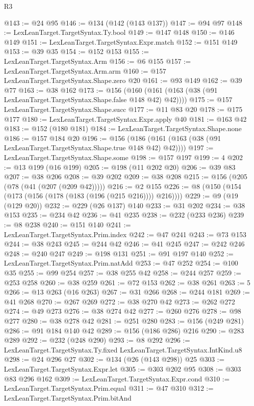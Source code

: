 \begin{lexlean}{R3}
\begin{coremodule}
@143 := @24 @95
@146 := @134 (@142 (@143 @137))
@147 := @94 @97
@148 := LexLeanTarget.TargetSyntax.Ty.bool
@149 := @147 @148
@150 := @146 @149
@151 := LexLeanTarget.TargetSyntax.Expr.match
@152 := @151 @149
@153 := @39 @35
@154 := @152 @153
@155 := LexLeanTarget.TargetSyntax.Arm
@156 := @6 @155
@157 := LexLeanTarget.TargetSyntax.Arm.arm
@160 := @157 LexLeanTarget.TargetSyntax.Shape.zero @20
@161 := @93 @149
@162 := @39 @77
@163 := @38 @162
@173 := @156 (@160 (@161 (@163 (@38 (@91 LexLeanTarget.TargetSyntax.Shape.false @148 @42) @42))))
@175 := @157 LexLeanTarget.TargetSyntax.Shape.succ
@177 := @11 @83 @20
@178 := @175 @177
@180 := LexLeanTarget.TargetSyntax.Expr.apply @40
@181 := @163 @42
@183 := @152 (@180 @181)
@184 := LexLeanTarget.TargetSyntax.Shape.none
@186 := @157 @184 @20
@196 := @156 (@186 (@161 (@163 (@38 (@91 LexLeanTarget.TargetSyntax.Shape.true @148 @42) @42))))
@197 := LexLeanTarget.TargetSyntax.Shape.some
@198 := @157 @197
@199 := 4
@202 := @13 @199 (@16 @199)
@205 := @198 (@11 @202 @20)
@206 := @39 @83
@207 := @38 @206
@208 := @39 @202
@209 := @38 @208
@215 := @156 (@205 (@78 (@41 (@207 (@209 @42)))))
@216 := @2 @155
@226 := @8 (@150 (@154 (@173 (@156 (@178 (@183 (@196 (@215 @216)))) @216))))
@229 := @9 (@19 (@129 @20))
@232 := @229 (@26 @137) @140
@233 := @31 @202
@234 := @38 @153
@235 := @234 @42
@236 := @41 @235
@238 := @232 (@233 @236)
@239 := @8 @238
@240 := @151 @140
@241 := LexLeanTarget.TargetSyntax.Prim.index
@242 := @47 @241
@243 := @73 @153
@244 := @38 @243
@245 := @244 @42
@246 := @41 @245
@247 := @242 @246
@248 := @240 @247
@249 := @198 @131
@251 := @91 @197 @140
@252 := LexLeanTarget.TargetSyntax.Prim.natAdd
@253 := @47 @252
@254 := @100 @35
@255 := @99 @254
@257 := @38 @255 @42
@258 := @244 @257
@259 := @253 @258
@260 := @38 @259
@261 := @72 @153
@262 := @38 @261
@263 := 5
@266 := @13 @263 (@16 @263)
@267 := @31 @266
@268 := @244 @181
@269 := @41 @268
@270 := @267 @269
@272 := @38 @270 @42
@273 := @262 @272
@274 := @49 @273
@276 := @38 @274 @42
@277 := @260 @276
@278 := @98 @277
@280 := @38 @278 @42
@281 := @251 @280
@283 := @156 (@249 @281)
@286 := @91 @184 @140 @42
@289 := @156 (@186 @286) @216
@290 := @283 @289
@292 := @232 (@248 @290)
@293 := @8 @292
@296 := LexLeanTarget.TargetSyntax.Ty.fixed LexLeanTarget.TargetSyntax.IntKind.u8
@298 := @24 @296 @27
@302 := @134 (@26 (@143 @298)) @25
@303 := LexLeanTarget.TargetSyntax.Expr.let
@305 := @303 @202 @95
@308 := @303 @83 @296 @162
@309 := LexLeanTarget.TargetSyntax.Expr.cond
@310 := LexLeanTarget.TargetSyntax.Prim.equal
@311 := @47 @310
@312 := LexLeanTarget.TargetSyntax.Prim.bitAnd

\end{coremodule}
\end{lexlean}
